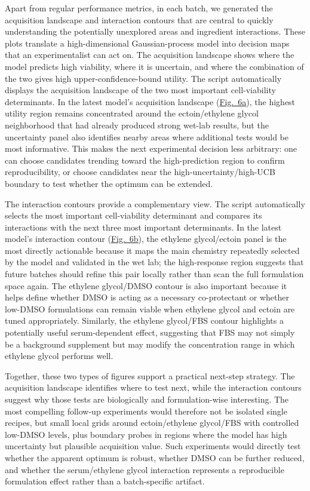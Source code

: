 \documentclass[11pt]{article}
\newcommand{\figref}[2][]{\hyperref[fig:#2]{Fig.~#2#1}}
\begin{document}
Apart from regular performance metrics, in each batch, we generated the acquisition landscape and interaction contours that are central to quickly understanding the potentially unexplored areas and ingredient interactions. These plots translate a high-dimensional Gaussian-process model into decision maps that an experimentalist can act on. The acquisition landscape shows where the model predicts high viability, where it is uncertain, and where the combination of the two gives high upper-confidence-bound utility. The script automatically displays the acquisition landscape of the two most important cell-viability determinants. In the latest model's acquisition landscape (\figref[a]{6}), the highest utility region remains concentrated around the ectoin/ethylene glycol neighborhood that had already produced strong wet-lab results, but the uncertainty panel also identifies nearby areas where additional tests would be most informative. This makes the next experimental decision less arbitrary: one can choose candidates trending toward the high-prediction region to confirm reproducibility, or choose candidates near the high-uncertainty/high-UCB boundary to test whether the optimum can be extended.

The interaction contours provide a complementary view. The script automatically selects the most important cell-viability determinant and compares its interactions with the next three most important determinants. In the latest model's interaction contour (\figref[b]{6}), the ethylene glycol/ectoin panel is the most directly actionable because it maps the main chemistry repeatedly selected by the model and validated in the wet lab; the high-response region suggests that future batches should refine this pair locally rather than scan the full formulation space again. The ethylene glycol/DMSO contour is also important because it helps define whether DMSO is acting as a necessary co-protectant or whether low-DMSO formulations can remain viable when ethylene glycol and ectoin are tuned appropriately. Similarly, the ethylene glycol/FBS contour highlights a potentially useful serum-dependent effect, suggesting that FBS may not simply be a background supplement but may modify the concentration range in which ethylene glycol performs well.

Together, these two types of figures support a practical next-step strategy. The acquisition landscape identifies where to test next, while the interaction contours suggest why those tests are biologically and formulation-wise interesting. The most compelling follow-up experiments would therefore not be isolated single recipes, but small local grids around ectoin/ethylene glycol/FBS with controlled low-DMSO levels, plus boundary probes in regions where the model has high uncertainty but plausible acquisition value. Such experiments would directly test whether the apparent optimum is robust, whether DMSO can be further reduced, and whether the serum/ethylene glycol interaction represents a reproducible formulation effect rather than a batch-specific artifact.
\end{document}
